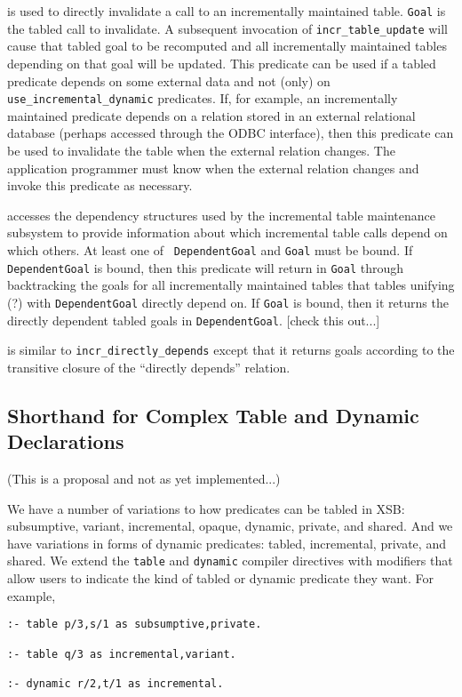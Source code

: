 \begin{description}
is used to directly invalidate a call to an incrementally maintained
table.  {\tt Goal} is the tabled call to invalidate.  A subsequent
invocation of {\tt incr\_table\_update} will cause that tabled goal to
be recomputed and all incrementally maintained tables depending on
that goal will be updated.  This predicate can be used if a tabled
predicate depends on some external data and not (only) on {\tt
use\_incremental\_dynamic} predicates.  If, for example, an incrementally
maintained predicate depends on a relation stored in an external
relational database (perhaps accessed through the ODBC interface),
then this predicate can be used to invalidate the table when the
external relation changes.  The application programmer must know when
the external relation changes and invoke this predicate as necessary.

accesses the dependency structures used by the incremental table
maintenance subsystem to provide information about which incremental
table calls depend on which others.  At least one of {\tt
DependentGoal} and {\tt Goal} must be bound.  If {\tt DependentGoal}
is bound, then this predicate will return in {\tt Goal} through
backtracking the goals for all incrementally maintained tables that
tables unifying (?) with {\tt DependentGoal} directly depend on.  If
{\tt Goal} is bound, then it returns the directly dependent tabled
goals in {\tt DependentGoal}.  [check this out...]

is similar to {\tt incr\_directly\_depends} except that it returns
goals according to the transitive closure of the ``directly depends''
relation.
\end{description}

\subsection{Shorthand for Complex Table and Dynamic Declarations}

(This is a proposal and not as yet implemented...)

We have a number of variations to how predicates can be tabled in XSB:
subsumptive, variant, incremental, opaque, dynamic, private, and
shared.  And we have variations in forms of dynamic predicates:
tabled, incremental, private, and shared.  We extend the {\tt table}
and {\tt dynamic} compiler directives with modifiers that allow users
to indicate the kind of tabled or dynamic predicate they want.  For
example,
\begin{verbatim}
:- table p/3,s/1 as subsumptive,private.

:- table q/3 as incremental,variant.

:- dynamic r/2,t/1 as incremental.
\end{verbatim}

